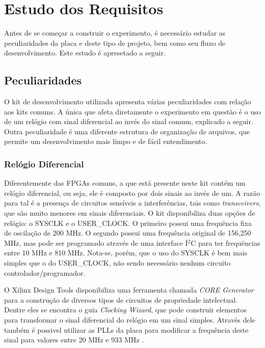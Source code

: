 \documentclass[11pt,a4paper,oneside]{book}
\begin{document}
\section{Estudo dos Requisitos}
Antes de se começar a construir o experimento, é necessário estudar as peculiaridades da placa e deste tipo de projeto, bem como seu fluxo de desenvolvimento.
Este estudo é apresetado a seguir.

\subsection{Peculiaridades}
O kit de desenvolvimento utilizada apresenta várias peculiaridades com relação aos kits comuns.
A única que afeta diretamente o experimento em questão é o uso de um relógio com sinal diferencial ao invés do sinal comum, explicado a seguir.
Outra peculiaridade é uma diferente estrutura de organização de arquivos, que permite um desenvolvimento mais limpo e de fácil entendimento.

\subsubsection{Relógio Diferencial}
Diferentemente das FPGAs comuns, a que está presente neste kit contém um relógio diferencial, ou seja, ele é composto por dois sinais ao invés de um.
A razão para tal é a presença de circuitos sensíveis a interferências, tais como \textit{transceivers}, que são muito menores em sinais diferenciais.
O kit disponibiliza duas opções de relógio: o SYSCLK e o USER\_CLOCK.
O primeiro possui uma frequência fixa de oscilação de 200 MHz.
O segundo possui uma frequência original de 156,250 MHz, mas pode ser programado através de uma interface I$^2$C para ter frequências entre 10 MHz e 810 MHz.
Nota-se, porém, que o uso do SYSCLK é bem mais simples que o do USER\_CLOCK, não sendo necessário nenhum circuito controlador/programador.

O Xilinx Design Tools disponibiliza uma ferramenta chamada \textit{CORE Generator} para a construção de diversos tipos de circuitos de propriedade intelectual.
Dentre eles se encontra o guia \textit{Clocking Wizard}, que pode construir elementos para transformar o sinal diferencial do relógio em um sinal simples.
Através dele também é possivel utilizar as PLLs da placa para modificar a frequência deste sinal para valores entre 20 MHz e 933 MHz \cite{ds182}.
\end{document}
